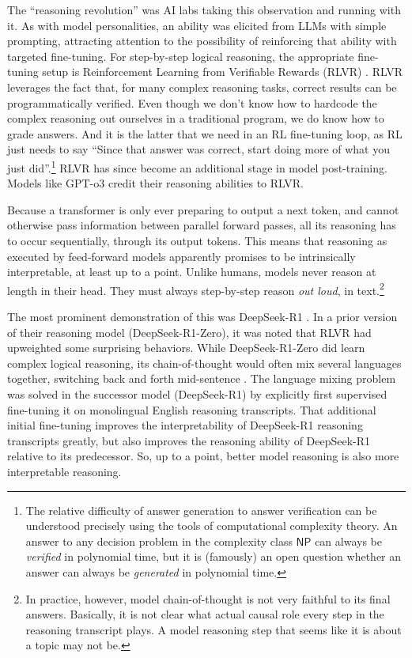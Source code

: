 The ``reasoning revolution'' was AI labs taking this observation and running
with it. As with model personalities, an ability was elicited from LLMs with
simple prompting, attracting attention to the possibility of reinforcing that
ability with targeted fine-tuning. For step-by-step logical reasoning, the
appropriate fine-tuning setup is Reinforcement Learning from Verifiable Rewards
(RLVR) \cite{lambert2025tulu}. RLVR leverages the fact that, for many complex
reasoning tasks, correct results can be programmatically verified. Even though
we don't know how to hardcode the complex reasoning out ourselves in a
traditional program, we do know how to grade answers. And it is the latter that
we need in an RL fine-tuning loop, as RL just needs to say ``Since that answer
was correct, start doing more of what you just did''.\footnote{The relative
difficulty of answer generation to answer verification can be understood
precisely using the tools of computational complexity theory. An answer to any
decision problem in the complexity class $\mathsf{NP}$ can always be
\emph{verified} in polynomial time, but it is (famously) an open question
whether an answer can always be \emph{generated} in polynomial time.} RLVR has
since become an additional stage in model post-training. Models like GPT-o3
credit their reasoning abilities to RLVR.

Because a transformer is only ever preparing to output a next token, and cannot
otherwise pass information between parallel forward passes, all its reasoning
has to occur sequentially, through its output tokens. This means that reasoning
as executed by feed-forward models apparently promises to be intrinsically
interpretable, at least up to a point. Unlike humans, models never reason at
length in their head. They must always step-by-step reason \emph{out loud}, in
text.\footnote{In practice, however, model chain-of-thought is not very
faithful to its final answers. Basically, it is not clear what actual causal
role every step in the reasoning transcript plays. A model reasoning step that
seems like it is about a topic may not be.}

The most prominent demonstration of this was DeepSeek-R1
\cite{deepseekai2025deepseek}. In a prior version of their reasoning model
(DeepSeek-R1-Zero), it was noted that RLVR had upweighted some surprising
behaviors. While DeepSeek-R1-Zero did learn complex logical reasoning, its
chain-of-thought would often mix several languages together, switching back and
forth mid-sentence \cite{deepseekai2025deepseek}. The language mixing problem
was solved in the successor model (DeepSeek-R1) by explicitly first supervised
fine-tuning it on monolingual English reasoning transcripts. That additional
initial fine-tuning improves the interpretability of DeepSeek-R1 reasoning
transcripts greatly, but also improves the reasoning ability of DeepSeek-R1
relative to its predecessor. So, up to a point, better model reasoning is also
more interpretable reasoning.

